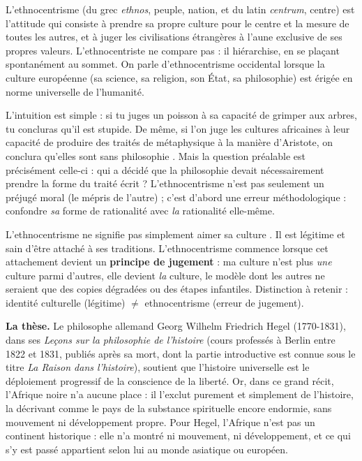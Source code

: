 \documentclass[11pt]{article}
\newcommand{\cle}[1]{{\popxbold\color{popdark}#1}}
\newcounter{popsec}
\newcounter{popsub}
\newcommand{\courssub}[1]{%
  \stepcounter{popsub}%
  \par\vspace{9pt}\noindent{\popxbold\fontsize{11.5}{13}\selectfont\color{popink}{\color{poporange}\thepopsec.\thepopsub}\hspace{6pt}#1}\par\nopagebreak\vspace{4pt}
}
\begin{document}
\begin{definition}[Ethnocentrisme]
L'\cle{ethnocentrisme} (du grec \emph{ethnos}, peuple, nation, et du latin \emph{centrum}, centre) est l'attitude qui consiste à prendre sa propre culture pour le centre et la mesure de toutes les autres, et à juger les civilisations étrangères à l'aune exclusive de ses propres valeurs. L'ethnocentriste ne compare pas : il hiérarchise, en se plaçant spontanément au sommet. On parle d'\cle{ethnocentrisme occidental} lorsque la culture européenne (sa science, sa religion, son État, sa philosophie) est érigée en norme universelle de l'humanité.
\end{definition}

L'intuition est simple : si tu juges un poisson à sa capacité de grimper aux arbres, tu concluras qu'il est stupide. De même, si l'on juge les cultures africaines à leur capacité de produire des traités de métaphysique à la manière d'Aristote, on conclura qu'elles sont \guillemotleft sans philosophie \guillemotright. Mais la question préalable est précisément celle-ci : qui a décidé que la philosophie devait nécessairement prendre la forme du traité écrit ? L'ethnocentrisme n'est pas seulement un préjugé moral (le mépris de l'autre) ; c'est d'abord une erreur méthodologique : confondre \emph{sa} forme de rationalité avec \emph{la} rationalité elle-même.

\begin{attention}
L'ethnocentrisme ne signifie pas simplement \guillemotleft aimer sa culture \guillemotright. Il est légitime et sain d'être attaché à ses traditions. L'ethnocentrisme commence lorsque cet attachement devient un \textbf{principe de jugement} : ma culture n'est plus \emph{une} culture parmi d'autres, elle devient \emph{la} culture, le modèle dont les autres ne seraient que des copies dégradées ou des étapes infantiles. Distinction à retenir : \cle{identité culturelle} (légitime) $\neq$ \cle{ethnocentrisme} (erreur de jugement).
\end{attention}

\courssub{Hegel : l'Afrique « hors de l'histoire »}

\textbf{La thèse.} Le philosophe allemand Georg Wilhelm Friedrich Hegel (1770-1831), dans ses \emph{Leçons sur la philosophie de l'histoire} (cours professés à Berlin entre 1822 et 1831, publiés après sa mort, dont la partie introductive est connue sous le titre \emph{La Raison dans l'histoire}), soutient que l'histoire universelle est le déploiement progressif de la conscience de la liberté. Or, dans ce grand récit, l'Afrique noire n'a aucune place : il l'exclut purement et simplement de l'histoire, la décrivant comme le pays de la substance spirituelle encore endormie, sans mouvement ni développement propre. Pour Hegel, l'Afrique \guillemotleft n'est pas un continent historique \guillemotright : elle n'a montré ni mouvement, ni développement, et ce qui s'y est passé appartient selon lui au monde asiatique ou européen.
\end{document}
